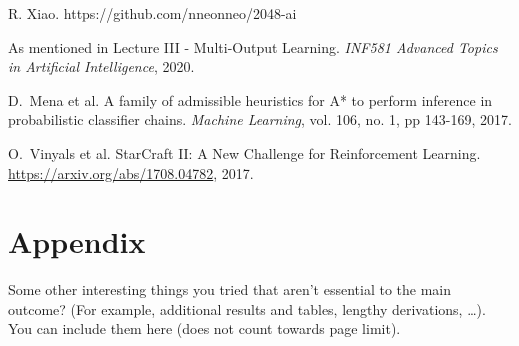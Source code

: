 \documentclass[journal, a4paper]{IEEEtran}
\begin{document}
\begin{thebibliography}{4}

	R. Xiao. https://github.com/nneonneo/2048-ai

		As mentioned in Lecture III - Multi-Output Learning. \textit{INF581 Advanced Topics in Artificial Intelligence}, 2020.

	D.~Mena et al. A family of admissible heuristics for A* to perform inference in probabilistic classifier chains.
	{\em Machine Learning}, vol. 106, no. 1, pp 143-169, 2017.

	O.~Vinyals et al. StarCraft {II:} {A} New Challenge for Reinforcement Learning.
	\url{https://arxiv.org/abs/1708.04782}, 2017. 

\end{thebibliography}

\newpage
\section*{Appendix}
Some other interesting things you tried that aren't essential to the main outcome? (For example, additional results and tables, lengthy derivations, \ldots). You can include them here (does not count towards page limit). 
\end{document}
